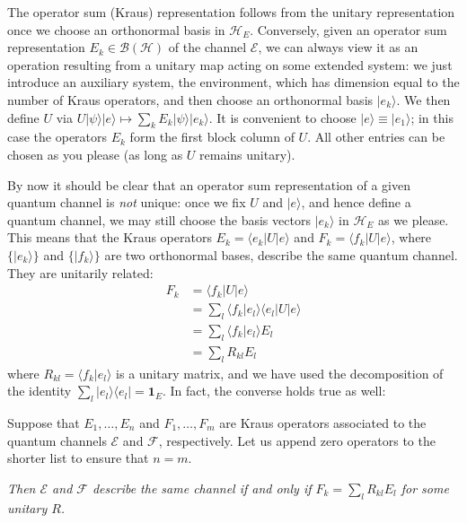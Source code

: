 \documentclass[fleqn]{article}
\newenvironment{idea}{\noindent}{\medskip}
\begin{document}
The operator sum (Kraus) representation follows from the unitary representation once we choose an orthonormal basis in \(\mathcal{H}_E\).
Conversely, given an operator sum representation \(E_k\in\mathscr{B}(\mathcal{H})\) of the channel \(\mathcal{E}\), we can always view it as an operation resulting from a unitary map acting on some extended system: we just introduce an auxiliary system, the environment, which has dimension equal to the number of Kraus operators, and then choose an orthonormal basis \(|e_k\rangle\).
We then define \(U\) via \(U|\psi\rangle|e\rangle\mapsto\sum_k E_k|\psi\rangle|e_k\rangle\).
It is convenient to choose \(|e\rangle\equiv|e_1\rangle\); in this case the operators \(E_k\) form the first block column of \(U\).
All other entries can be chosen as you please (as long as \(U\) remains unitary).

By now it should be clear that an operator sum representation of a given quantum channel is \emph{not} unique: once we fix \(U\) and \(|e\rangle\), and hence define a quantum channel, we may still choose the basis vectors \(|e_k\rangle\) in \(\mathcal{H}_E\) as we please.
This means that the Kraus operators \(E_k=\langle e_k|U|e\rangle\) and \(F_k=\langle f_k|U|e\rangle\), where \(\{|e_k\rangle\}\) and \(\{|f_k\rangle\}\) are two orthonormal bases, describe the same quantum channel.
They are unitarily related:
\[
  \begin{aligned}
    F_k
    &=\langle f_k| U|e\rangle
  \\&=\sum_l\langle f_k|e_l\rangle\langle e_l|U|e\rangle
  \\&=\sum_l \langle f_k|e_l\rangle E_l
  \\&=\sum_l R_{kl} E_l
  \end{aligned}
\]
where \(R_{kl}=\langle f_k |e_l\rangle\) is a unitary matrix, and we have used the decomposition of the identity \(\sum_l|e_l\rangle\langle e_l|=\mathbf{1}_E\).
In fact, the converse holds true as well:

\begin{idea}

Suppose that \(E_1,\ldots,E_n\) and \(F_1,\ldots,F_m\) are Kraus operators associated to the quantum channels \(\mathcal{E}\) and \(\mathcal{F}\), respectively.
Let us append zero operators to the shorter list to ensure that \(n=m\).

\emph{Then \(\mathcal{E}\) and \(\mathcal{F}\) describe the same channel if and only if \(F_k=\sum_l R_{kl} E_l\) for some unitary \(R\).}

\end{idea}
\end{document}
